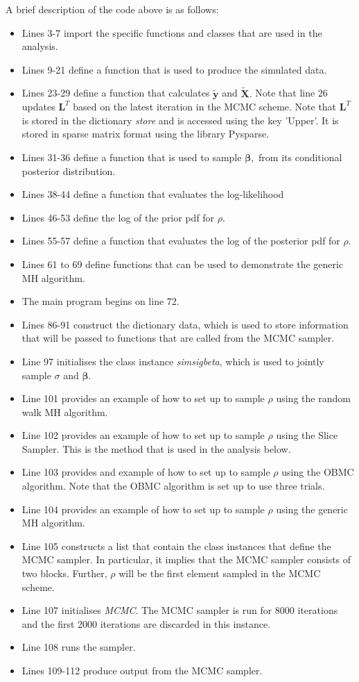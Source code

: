 \documentclass[article]{jss}
\begin{document}
A brief description of the code above is as follows: 
\begin{itemize}
\item Lines 3-7 import the specific functions and classes that are used
in the analysis. 
\item Lines 9-21 define a function that is used to produce the simulated
data. 
\item Lines 23-29 define a function that calculates $\tilde{\bm{y}}$
  and $\bm{\tilde{X}}.$ Note that line 26 updates $\bm{L}^{T}$ based
  on the latest iteration in the MCMC scheme. Note that $\bm{L}^{T}$
  is stored in the  dictionary \emph{store} and is
  accessed using the key 'Upper'. It is stored in sparse matrix format
  using the library Pysparse.
\item Lines 31-36 define a function that is used to sample $\bm{\beta},$
from its conditional posterior distribution.
\item Lines 38-44 define a function that evaluates the log-likelihood
\item Lines 46-53 define the log of the prior pdf for $\rho$.
\item Lines 55-57 define a function that evaluates the log of the posterior
pdf for $\rho.$
\item Lines 61 to 69 define functions that can be used to demonstrate
  the generic MH algorithm.
\item The main program begins on line 72.
\item Lines 86-91 construct the  dictionary data, which is used to
store information that will be passed to functions that are called
from the MCMC sampler.
\item Line 97 initialises the class instance \emph{simsigbeta}, which is
used to jointly sample $\sigma$ and $\bm{\beta}.$ 
\item Line 101 provides an example of how to set up  to sample $\rho$
using the random walk MH algorithm.
\item Line 102 provides an example of how to set up  to sample $\rho$
using the Slice Sampler. This is the method that is used in the analysis
below.
\item Line 103 provides and example of how to set up  to sample $\rho$
using the OBMC algorithm. Note that the OBMC algorithm is set up to
use three trials.
\item Line 104 provides an example of how to set up  to sample $\rho$
using the generic MH algorithm.
\item Line 105 constructs a  list that contain the class instances
that define the MCMC sampler. In particular, it implies that the MCMC
sampler consists of two blocks. Further, $\rho$ will be the first
element sampled in the MCMC scheme. 
\item Line 107 initialises \emph{MCMC}. The MCMC sampler is run for 8000
iterations and the first 2000 iterations are discarded in this instance.
\item Line 108 runs the sampler.
\item Lines 109-112 produce output from the MCMC sampler.
\end{itemize}
\end{document}
